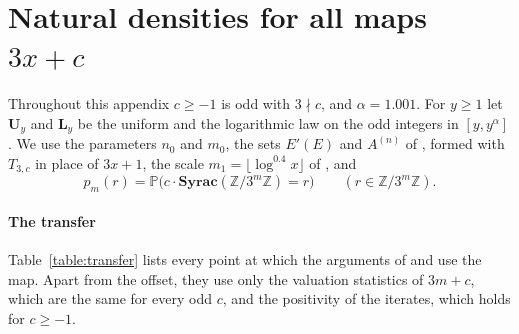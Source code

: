 \documentclass[12pt]{amsart}
\theoremstyle{definition}
\theoremstyle{remark}
\begin{document}
\FloatBarrier
\section{Natural densities for all maps \texorpdfstring{$3x+c$}{3x+c}}
\label{appx:natural}
Throughout this appendix $c\ge-1$ is odd with $3\nmid c$, and $\alpha=1.001$. For $y\ge1$ let $\mathbf U_y$ and $\mathbf L_y$ be the uniform and the logarithmic law on the odd integers in $[y,y^\alpha]$. We use the parameters $n_0$ and $m_0$, the sets $E'(E)$ and $A^{(n)}$ of \cite[(5.1), (5.2), (5.10), (5.11)]{Tao_2022}, formed with $T_{3,c}$ in place of $3x+1$, the scale $m_1=\lfloor\log^{0.4}x\rfloor$ of \cite[Section~6]{Allikvere_2026}, and
\[
 p_m(r)=\mathbb P\bigl(c\cdot\mathbf{Syrac}(\mathbb Z/3^m\mathbb Z)=r\bigr)\qquad(r\in\mathbb Z/3^m\mathbb Z).
\]

\paragraph{The transfer} Table~\ref{table:transfer} lists every point at which the arguments of \cite[Sections~1.3--5]{Tao_2022} and \cite[Sections~2--6]{Allikvere_2026} use the map. Apart from the offset, they use only the valuation statistics of $3m+c$, which are the same for every odd $c$, and the positivity of the iterates, which holds for $c\ge-1$.
\end{document}
